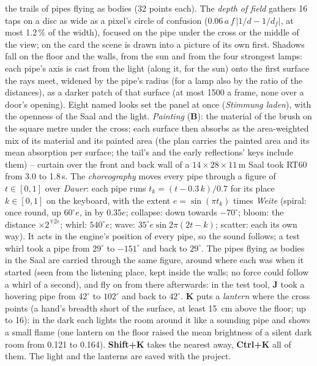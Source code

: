 \documentclass[11pt,a4paper,parskip=half,DIV=11,toc=bibliography]{scrartcl}
\newcommand{\ui}[1]{\emph{#1}}                 %
\begin{document}
the trails of pipes flying as bodies (32 points each). The \emph{depth of field} gathers 16 taps on a disc as wide as a pixel's circle of
confusion ($0.06\,a\,f\,|1/d - 1/d_f|$, at most 1.2\,\% of the width), focused on the pipe under the cross or the middle of the view;
on the card the scene is drawn into a picture of its own first.
Shadows fall on the floor and the walls, from the sun and from the four strongest lamps: each pipe's axis is cast from the light (along it, for
the sun) onto the first surface the rays meet, widened by the pipe's radius (for a lamp also by the ratio of the distances), as a darker patch
of that surface (at most 1500 a frame, none over a door's opening). Eight named looks set the panel at once (\ui{Stimmung laden}), with the
openness of the Saal and the light. \emph{Painting} (\textbf{B}): the material of the brush on the square metre under the cross; each surface
then absorbs as the area-weighted mix of its material and its painted area (the plan carries the painted area and its mean absorption per
surface; the tail's and the early reflections' keys include them) -- curtain over the front and back wall of a $14\times28\times11$\,m Saal took
RT60 from 3.0 to 1.8\,s. The \emph{choreography} moves every pipe through a figure of $t \in [0,1]$ over \ui{Dauer}: each pipe runs
$t_k = (t - 0.3\,k)/0.7$ for its place $k \in [0,1]$ on the keyboard, with the extent $e = \sin(\pi t_k)$ times \ui{Weite} (spiral: once round,
up $60^\circ e$, in by $0.35e$; collapse: down towards $-70^\circ$; bloom: the distance $\times 2^{\mp 2e}$; whirl: $540^\circ e$; wave:
$35^\circ e\sin 2\pi(2t - k)$; scatter: each its own way). It acts in the engine's position of every pipe, so the sound follows; a test whirl took a pipe from $29^\circ$ to
$-151^\circ$ and back to $29^\circ$. The pipes flying as bodies in the Saal are carried through the same figure, around where each was when it
started (seen from the listening place, kept inside the walls; no force could follow a whirl of a second), and fly on from there afterwards:
in the test tool, \textbf{J} took a hovering pipe from $42^\circ$ to $102^\circ$ and back to $42^\circ$.
\textbf{K} puts a \emph{lantern} where the cross points (a hand's breadth short of the surface, at least \SI{15}{cm} above the floor; up to 16):
in the dark each lights the room around it like a sounding pipe and shows a small flame (one lantern on the floor raised the mean brightness of a
silent dark room from 0.121 to 0.164). \textbf{Shift+K} takes the nearest away, \textbf{Ctrl+K} all of them. The light and the lanterns are saved with the project.
\end{document}
